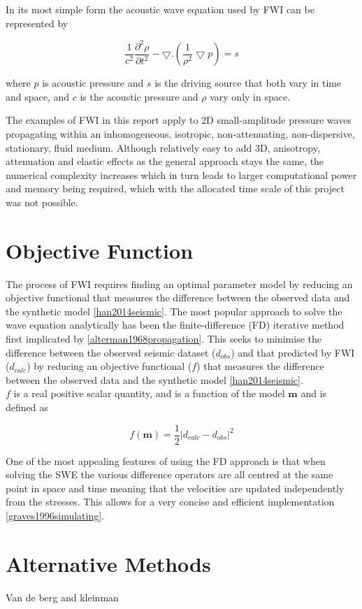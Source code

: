 In its most simple form the acoustic wave equation used by FWI can be represented by 

\begin{equation}
\frac{1}{c^{2}}\frac{\partial  ^{2}\rho }{\partial t^{2}} -\bigtriangledown.\left ( \frac{1}{\rho^{2}} \bigtriangledown p\right ) = s
\label{simple_wave_equation}
\end{equation}

where $p$ is acoustic pressure and $s$ is the driving source that both vary in time and space, and $c$ is the acoustic pressure and $\rho$ vary only in space. 

The examples of FWI in this report apply to 2D small-amplitude pressure waves propagating within an inhomogeneous, isotropic, non-attenuating, non-dispersive, stationary, fluid medium. Although relatively easy to add 3D, anisotropy, attenuation and elastic effects as the general approach stays the same, the numerical complexity increases which in turn leads to larger computational power and memory being required, which with the allocated time scale of this project was not possible. 

\section{Objective Function}
The process of FWI requires finding an optimal parameter model by reducing an objective functional that measures the difference between the observed data and the synthetic model \ref{han2014seismic}.  
The most popular approach to solve the wave equation analytically has been the finite-difference (FD) iterative method first implicated by \ref{alterman1968propagation}. This seeks to minimise the difference between the observed seismic dataset ($d_{obs}$) and that predicted by FWI ($d_{calc}$) by reducing an objective functional ($f$) that measures the difference between the observed data and the synthetic model \ref{han2014seismic}. 
\\ $f$ is a real positive scalar quantity, and is a function of the model $\mathbf{m}$ and is defined as 

\begin{equation}
f(\mathbf{m})= \frac{1}{2}\left | d_{calc}-d_{obs} \right|^{2}
\label{objective_function}
\end{equation}


One of the most appealing features of using the FD approach is that when solving the SWE the various difference operators are all centred at the same point in space and time meaning that the velocities are updated independently from the stresses. This allows for a very concise and efficient implementation \ref{graves1996simulating}. 




\section{Alternative Methods} 
  Van de berg and kleinman 

